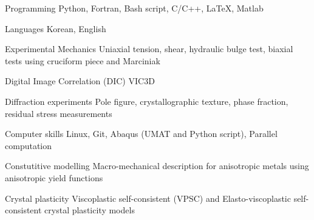 

\begin{cvskills}
  \cvskill
  {Programming}
  {Python, Fortran, Bash script, C/C++, LaTeX, Matlab}

  \cvskill
  {Languages}
  {Korean, English}

  \cvskill
  {Experimental Mechanics}
  {Uniaxial tension, shear, hydraulic bulge test, biaxial tests using cruciform piece and Marciniak}

  \cvskill
  {Digital Image Correlation (DIC)}
  {VIC3D}

  \cvskill
  {Diffraction experiments}
  {Pole figure, crystallographic texture, phase fraction, residual stress measurements}

  \cvskill
  {Computer skills}
  {Linux, Git, Abaqus (UMAT and Python script), Parallel computation}

  \cvskill
  {Constutitive modelling}
  {Macro-mechanical description for anisotropic metals using anisotropic yield functions}

  \cvskill
  {Crystal plasticity}
  {Viscoplastic self-consistent (VPSC) and Elasto-viscoplastic self-consistent crystal plasticity models}


\end{cvskills}